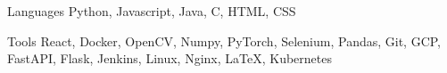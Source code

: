 

\begin{cvskills}

  \cvskill
    {Languages} %
    {Python, Javascript, Java, C, HTML, CSS} %

  \cvskill
    {Tools} %
    {React, Docker, OpenCV, Numpy, PyTorch, Selenium, Pandas, Git, GCP, FastAPI, Flask, Jenkins, Linux, Nginx, LaTeX, Kubernetes} %

\end{cvskills}

